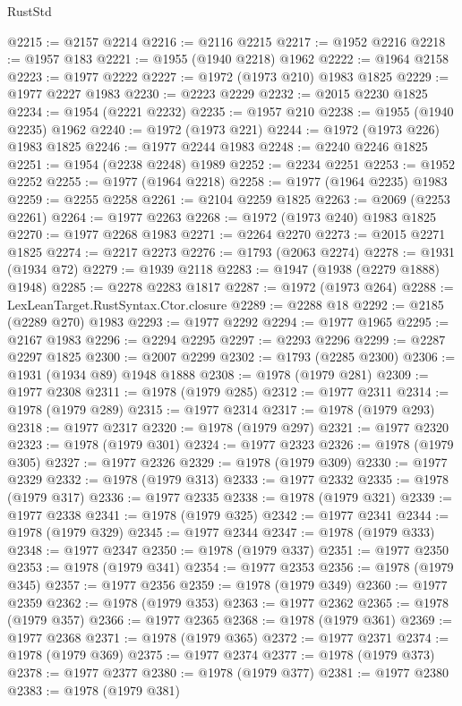 \begin{lexlean}{RustStd}
\begin{coremodule}
@2215 := @2157 @2214
@2216 := @2116 @2215
@2217 := @1952 @2216
@2218 := @1957 @183
@2221 := @1955 (@1940 @2218) @1962
@2222 := @1964 @2158
@2223 := @1977 @2222
@2227 := @1972 (@1973 @210) @1983 @1825
@2229 := @1977 @2227 @1983
@2230 := @2223 @2229
@2232 := @2015 @2230 @1825
@2234 := @1954 (@2221 @2232)
@2235 := @1957 @210
@2238 := @1955 (@1940 @2235) @1962
@2240 := @1972 (@1973 @221)
@2244 := @1972 (@1973 @226) @1983 @1825
@2246 := @1977 @2244 @1983
@2248 := @2240 @2246 @1825
@2251 := @1954 (@2238 @2248) @1989
@2252 := @2234 @2251
@2253 := @1952 @2252
@2255 := @1977 (@1964 @2218)
@2258 := @1977 (@1964 @2235) @1983
@2259 := @2255 @2258
@2261 := @2104 @2259 @1825
@2263 := @2069 (@2253 @2261)
@2264 := @1977 @2263
@2268 := @1972 (@1973 @240) @1983 @1825
@2270 := @1977 @2268 @1983
@2271 := @2264 @2270
@2273 := @2015 @2271 @1825
@2274 := @2217 @2273
@2276 := @1793 (@2063 @2274)
@2278 := @1931 (@1934 @72)
@2279 := @1939 @2118
@2283 := @1947 (@1938 (@2279 @1888) @1948)
@2285 := @2278 @2283 @1817
@2287 := @1972 (@1973 @264)
@2288 := LexLeanTarget.RustSyntax.Ctor.closure
@2289 := @2288 @18
@2292 := @2185 (@2289 @270) @1983
@2293 := @1977 @2292
@2294 := @1977 @1965
@2295 := @2167 @1983
@2296 := @2294 @2295
@2297 := @2293 @2296
@2299 := @2287 @2297 @1825
@2300 := @2007 @2299
@2302 := @1793 (@2285 @2300)
@2306 := @1931 (@1934 @89) @1948 @1888
@2308 := @1978 (@1979 @281)
@2309 := @1977 @2308
@2311 := @1978 (@1979 @285)
@2312 := @1977 @2311
@2314 := @1978 (@1979 @289)
@2315 := @1977 @2314
@2317 := @1978 (@1979 @293)
@2318 := @1977 @2317
@2320 := @1978 (@1979 @297)
@2321 := @1977 @2320
@2323 := @1978 (@1979 @301)
@2324 := @1977 @2323
@2326 := @1978 (@1979 @305)
@2327 := @1977 @2326
@2329 := @1978 (@1979 @309)
@2330 := @1977 @2329
@2332 := @1978 (@1979 @313)
@2333 := @1977 @2332
@2335 := @1978 (@1979 @317)
@2336 := @1977 @2335
@2338 := @1978 (@1979 @321)
@2339 := @1977 @2338
@2341 := @1978 (@1979 @325)
@2342 := @1977 @2341
@2344 := @1978 (@1979 @329)
@2345 := @1977 @2344
@2347 := @1978 (@1979 @333)
@2348 := @1977 @2347
@2350 := @1978 (@1979 @337)
@2351 := @1977 @2350
@2353 := @1978 (@1979 @341)
@2354 := @1977 @2353
@2356 := @1978 (@1979 @345)
@2357 := @1977 @2356
@2359 := @1978 (@1979 @349)
@2360 := @1977 @2359
@2362 := @1978 (@1979 @353)
@2363 := @1977 @2362
@2365 := @1978 (@1979 @357)
@2366 := @1977 @2365
@2368 := @1978 (@1979 @361)
@2369 := @1977 @2368
@2371 := @1978 (@1979 @365)
@2372 := @1977 @2371
@2374 := @1978 (@1979 @369)
@2375 := @1977 @2374
@2377 := @1978 (@1979 @373)
@2378 := @1977 @2377
@2380 := @1978 (@1979 @377)
@2381 := @1977 @2380
@2383 := @1978 (@1979 @381)

\end{coremodule}
\end{lexlean}

